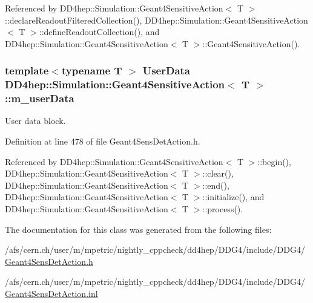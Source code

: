 Referenced by DD4hep::Simulation::Geant4SensitiveAction$<$ T $>$::declareReadoutFilteredCollection(), DD4hep::Simulation::Geant4SensitiveAction$<$ T $>$::defineReadoutCollection(), and DD4hep::Simulation::Geant4SensitiveAction$<$ T $>$::Geant4SensitiveAction().\hypertarget{class_d_d4hep_1_1_simulation_1_1_geant4_sensitive_action_a0e1c5a4683c5a4e50a0e3325b61f5275}{
\subsubsection[{m\_\-userData}]{\setlength{\rightskip}{0pt plus 5cm}template$<$typename T $>$ {\bf UserData} {\bf DD4hep::Simulation::Geant4SensitiveAction}$<$ T $>$::{\bf m\_\-userData}}}
\label{class_d_d4hep_1_1_simulation_1_1_geant4_sensitive_action_a0e1c5a4683c5a4e50a0e3325b61f5275}


User data block. 

Definition at line 478 of file Geant4SensDetAction.h.

Referenced by DD4hep::Simulation::Geant4SensitiveAction$<$ T $>$::begin(), DD4hep::Simulation::Geant4SensitiveAction$<$ T $>$::clear(), DD4hep::Simulation::Geant4SensitiveAction$<$ T $>$::end(), DD4hep::Simulation::Geant4SensitiveAction$<$ T $>$::initialize(), and DD4hep::Simulation::Geant4SensitiveAction$<$ T $>$::process().

The documentation for this class was generated from the following files:\begin{DoxyCompactItemize}
\item 
/afs/cern.ch/user/m/mpetric/nightly\_\-cppcheck/dd4hep/DDG4/include/DDG4/\hyperlink{_geant4_sens_det_action_8h}{Geant4SensDetAction.h}\item 
/afs/cern.ch/user/m/mpetric/nightly\_\-cppcheck/dd4hep/DDG4/include/DDG4/\hyperlink{_geant4_sens_det_action_8inl}{Geant4SensDetAction.inl}\end{DoxyCompactItemize}
